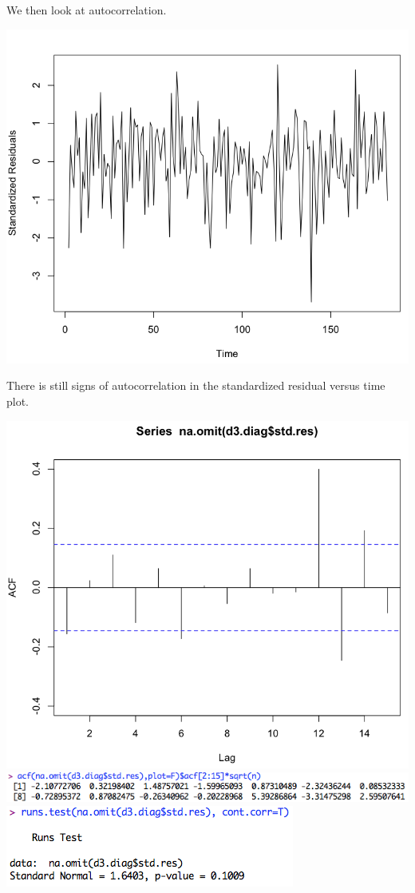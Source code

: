 \documentclass[a4 paper, 11 pt]{article}
\begin{document}
We then look at autocorrelation.
\begin{center}
\includegraphics[scale=0.3]{d3time}
\end{center}
There is still signs of autocorrelation in the standardized residual versus time plot. 
\begin{center}
\includegraphics[scale=0.3]{d3acf} \\
\includegraphics[scale=0.4]{d3acfz} \\
\includegraphics[scale=0.4]{d3runs}
\end{center}
\end{document}

